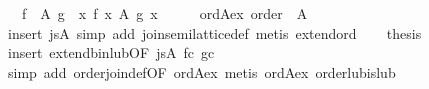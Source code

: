 \begin{isabellebody}
\ \ \ {}f\ {}\ A\isactrlesub \ g\ {}\ {}{}x{}\ f\ x\ {}\isactrlbsub A\isactrlesub \ g\ x{}{}\isanewline
%
\isadelimproof
%
\endisadelimproof
%
\isatagproof
{}\isamarkupfalse%
\ {}\isanewline
\ \ \isamarkupfalse%
\ ord{}A{}ex{}\ {}order\ {}{}\ A{}{}\isanewline
\ \ \ \ \isamarkupfalse%
\ {}insert\ js{}A{}\ simp\ add{}\ join{}semilattice{}def{}\ metis\ extend{}ord{}\isanewline
\isanewline
\ \ \isamarkupfalse%
\ {}thesis\isanewline
\ \ \ \ \isamarkupfalse%
\ {}insert\ extend{}binlub{}OF\ js{}A\ fc\ gc{}{}\isanewline
\ \ \ \ \isamarkupfalse%
\ {}simp\ add{}\ order{}join{}def{}OF\ ord{}A{}ex{}{}\ metis\ ord{}A{}ex\ order{}lub{}is{}lub{}\isanewline

\end{isabellebody}
